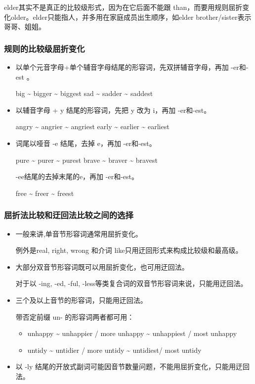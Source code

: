 elder其实不是真正的比较级形式，因为在它后面不能跟 than，而要用规则屈折变
化older。elder只能指人，并多用在家庭成员出生顺序，如elder brother/sister表示
哥哥、姐姐。

\subsubsection{规则的比较级屈折变化}

\begin{itemize}
\item 以单个元音字母+单个辅音字母结尾的形容词，先双拼辅音字母，再加 -er和-est 。

  big \~{} bigger \~{} biggest \qquad sad \~{} sadder \~{} saddest

\item 以辅音字母 + y 结尾的形容词，先把 y 改为 i，再加 -er和-est。

  angry \~{} angrier \~{} angriest \qquad early \~{} earlier \~{} earliest

\item 词尾以哑音 -e 结尾，去掉 e，再加 -er和-est。

  pure \~{} purer \~{} purest \qquad brave \~{} braver \~{} bravest

  -ee结尾的去掉末尾的e，再加 -er和-est。

  free \~{} freer \~{} freest

\end{itemize}

\subsubsection{屈折法比较和迂回法比较之间的选择}
\begin{itemize}
\item 一般来讲,单音节形容词通常用屈折变化。

  例外是real, right, wrong 和介词 like只用迂回形式来构成比较级和最高级。

\item 大部分双音节形容词既可以用屈折变化，也可用迂回法。

  对于以 -ing, -ed, -ful, -less等类复合词的双音节形容词来说，只能用迂回法。

\item 三个及以上音节的形容词，只能用迂回法。

  带否定前缀 un- 的形容词两者都可用：
  \begin{itemize}
  \item unhappy \~{} unhappier / more unhappy \~{} unhappiest / most unhappy

  \item untidy \~{} untidier / more untidy \~{} untidiest/ most untidy
  \end{itemize}
\item 以 -ly 结尾的开放式副词可能因音节数量问题，不能用屈折变化，只能用迂回法。
\end{itemize}

